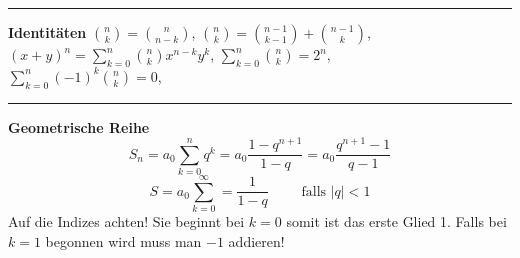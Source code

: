 \documentclass[a4paper, 12pt]{extarticle}
\newcommand{\sep}{\vspace{5pt}\noindent\hrule\vspace{5pt}}
\newcommand{\abs}[1]{\left\lvert #1 \right\rvert}
\begin{document}
\begin{multicols*}{2}
\begin{table}[H]
\end{table}

\sep

\textbf{Identitäten} $\binom{n}{k}=\binom{n}{n-k}$, \quad
$\binom{n}{k}=\binom{n-1}{k-1}+\binom{n-1}{k}$,
\\
$(x+y)^n=\sum_{k=0}^n\binom{n}{k}x^{n-k}y^k$, \quad
$\sum_{k=0}^n\binom{n}{k}=2^n$,\\
$\sum_{k=0}^n(-1)^k\binom{n}{k}=0$, 

\sep

\textbf{Geometrische Reihe}
\[
S_n = a_0\sum_{k=0}^n q^k = a_0\frac{1-q^{n+1}}{1-q} = a_0 \frac{q^{n+1}-1}{q-1}
\]
\[
S = a_0\sum_{k=0}^\infty = \frac{1}{1-q} \qquad \text{ falls } \abs{q}<1
\]
\Important Auf die Indizes achten! Sie beginnt bei $k=0$ somit ist das erste Glied
1. Falls bei $k=1$ begonnen wird muss man $-1$ addieren!


\end{multicols*}
\end{document}
